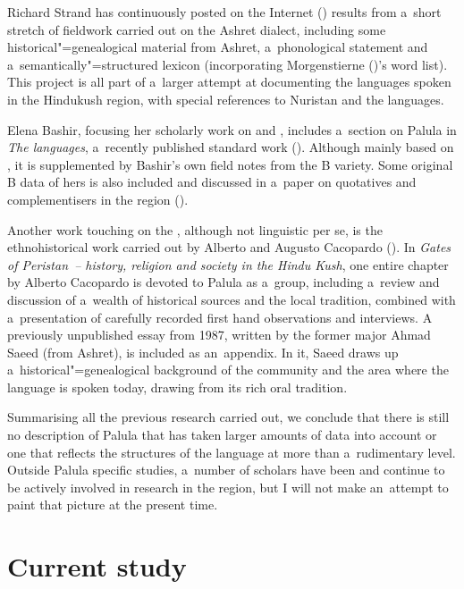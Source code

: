 Richard Strand has continuously posted on the Internet (\citeyear{strand1997/2015})
results from a~short stretch of fieldwork carried out on the Ashret dialect, including
some historical"=genealogical material from Ashret, a~phonological statement and
a~semantically"=structured lexicon (incorporating Morgenstierne (\citeyear{morgenstierne1941})'s word list). This project is
all part of a~larger attempt at documenting the languages spoken in the Hindukush region, with
special references to Nuristan and the \iliNuristani languages.


Elena Bashir, focusing her scholarly work on \iliKalasha and \iliKhowar, includes a~section on Palula in
\textit{The \iliIndoAryan languages}, a~recently published standard work
(\citeyear{bashir2003}). Although mainly based on \citet{morgenstierne1941}, it is supplemented by
Bashir's own field notes from the B variety. Some original B data of hers is also included and
discussed in a~paper on quotatives and complementisers in the region (\citeyear{bashir1996}).


Another work touching on the , although not linguistic per se, is the ethnohistorical work
carried out by Alberto and Augusto Cacopardo (\citeyear{cacopardo2001}). In \textit{Gates of
  Peristan~-- history, religion and society in the Hindu Kush}, one entire chapter by Alberto
Cacopardo is devoted to Palula as a~group, including a~review and discussion of a~wealth of
historical sources and the local tradition, combined with a~presentation of carefully recorded first
hand observations and interviews. A previously unpublished essay from 1987, written by the former
major Ahmad Saeed (from Ashret), is included as an~appendix. In it, Saeed draws up
a~historical"=genealogical background of the community and the area where the language is spoken
today, drawing from its rich oral tradition.

\largerpage
Summarising all the previous research carried out, we conclude that there is still no description of
Palula that has taken larger amounts of data into account or one that reflects the structures of the
language at more than a~rudimentary level. Outside Palula specific studies, a~number of scholars have been and continue to be actively involved
in research in the region, but I will not make an~attempt to paint that picture at the present time.


\section{Current study}
\label{sec:1-6}

